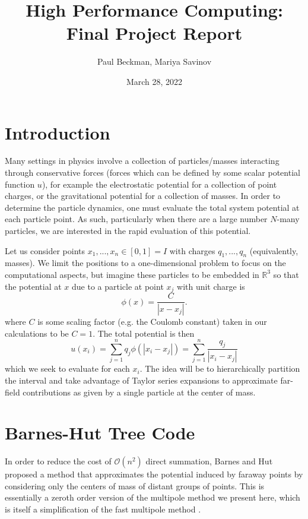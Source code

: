 \documentclass{article}
\title{High Performance Computing: Final Project Report}
\author{Paul Beckman, Mariya Savinov}
\date{March 28, 2022}
\newcommand{\abs}[1]{\left|#1\right|}
\renewcommand{\O}{\mathcal{O}}
\newcommand{\R}{\mathbb{R}}
\newcommand {\beq} {\begin{equation}}
\newcommand {\eeq} {\end{equation}}
\begin{document}
\maketitle

\section{Introduction}
Many settings in physics involve a collection of particles/masses interacting through conservative forces (forces which can be defined by some scalar potential function $u$), for example the electrostatic potential for a collection of point charges, or the gravitational potential for a collection of masses. In order to determine the particle dynamics, one must evaluate the total system potential at each particle point. As such, particularly when there are a large number $N$-many particles, we are interested in the rapid evaluation of this potential.

Let us consider points $x_1,...,x_n\in[0,1]=I$ with charges $q_1,...,q_n$ (equivalently, masses). We limit the positions to a one-dimensional problem to focus on the computational aspects, but imagine these particles to be embedded in $\R^3$ so that the potential at $x$ due to a particle at point $x_j$ with unit charge is
\beq
        \phi(x) = \frac{C}{\abs{x-x_j}}.
\eeq
where $C$ is some scaling factor (e.g. the Coulomb constant) taken in our calculations to be $C=1$. The total potential is then
\beq
        u(x_i) = \sum_{j=1}^n q_j \phi(\abs{x_i - x_j}) = \sum_{j=1}^n \dfrac{q_j}{\abs{x_i-x_j}}
\label{eq:potential}
\eeq
which we seek to evaluate for each $x_i$. The idea will be to hierarchically partition the interval and take advantage of Taylor series expansions to approximate far-field contributions as given by a single particle at the center of mass.

\section{Barnes-Hut Tree Code}
In order to reduce the cost of $\O(n^2)$ direct summation, Barnes and Hut \cite{barnes1986hierarchical} proposed a method that approximates the potential induced by faraway points by considering only the centers of mass of distant groups of points. This is essentially a zeroth order version of the multipole method we present here, which is itself a simplification of the fast multipole method \cite{greengard1987fast}.
\end{document}
